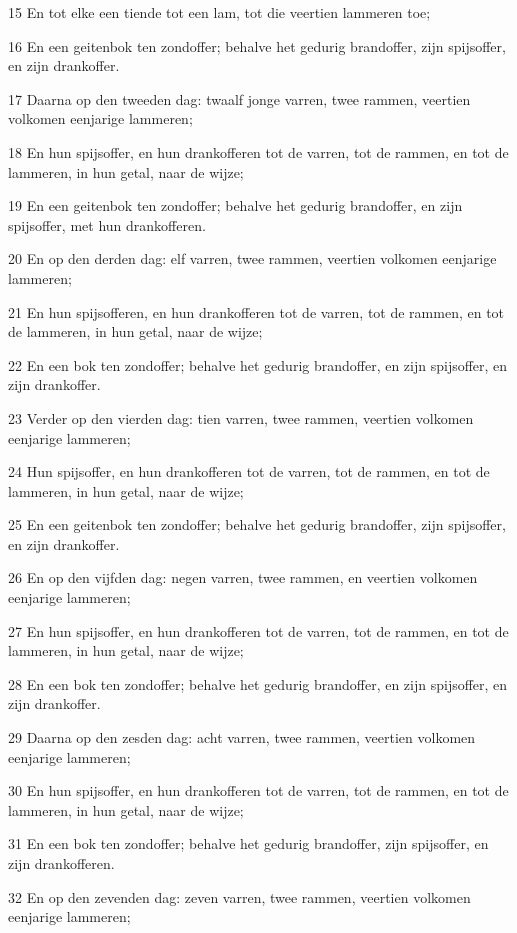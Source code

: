 \par 15 En tot elke een tiende tot een lam, tot die veertien lammeren toe;
\par 16 En een geitenbok ten zondoffer; behalve het gedurig brandoffer, zijn spijsoffer, en zijn drankoffer.
\par 17 Daarna op den tweeden dag: twaalf jonge varren, twee rammen, veertien volkomen eenjarige lammeren;
\par 18 En hun spijsoffer, en hun drankofferen tot de varren, tot de rammen, en tot de lammeren, in hun getal, naar de wijze;
\par 19 En een geitenbok ten zondoffer; behalve het gedurig brandoffer, en zijn spijsoffer, met hun drankofferen.
\par 20 En op den derden dag: elf varren, twee rammen, veertien volkomen eenjarige lammeren;
\par 21 En hun spijsofferen, en hun drankofferen tot de varren, tot de rammen, en tot de lammeren, in hun getal, naar de wijze;
\par 22 En een bok ten zondoffer; behalve het gedurig brandoffer, en zijn spijsoffer, en zijn drankoffer.
\par 23 Verder op den vierden dag: tien varren, twee rammen, veertien volkomen eenjarige lammeren;
\par 24 Hun spijsoffer, en hun drankofferen tot de varren, tot de rammen, en tot de lammeren, in hun getal, naar de wijze;
\par 25 En een geitenbok ten zondoffer; behalve het gedurig brandoffer, zijn spijsoffer, en zijn drankoffer.
\par 26 En op den vijfden dag: negen varren, twee rammen, en veertien volkomen eenjarige lammeren;
\par 27 En hun spijsoffer, en hun drankofferen tot de varren, tot de rammen, en tot de lammeren, in hun getal, naar de wijze;
\par 28 En een bok ten zondoffer; behalve het gedurig brandoffer, en zijn spijsoffer, en zijn drankoffer.
\par 29 Daarna op den zesden dag: acht varren, twee rammen, veertien volkomen eenjarige lammeren;
\par 30 En hun spijsoffer, en hun drankofferen tot de varren, tot de rammen, en tot de lammeren, in hun getal, naar de wijze;
\par 31 En een bok ten zondoffer; behalve het gedurig brandoffer, zijn spijsoffer, en zijn drankofferen.
\par 32 En op den zevenden dag: zeven varren, twee rammen, veertien volkomen eenjarige lammeren;

